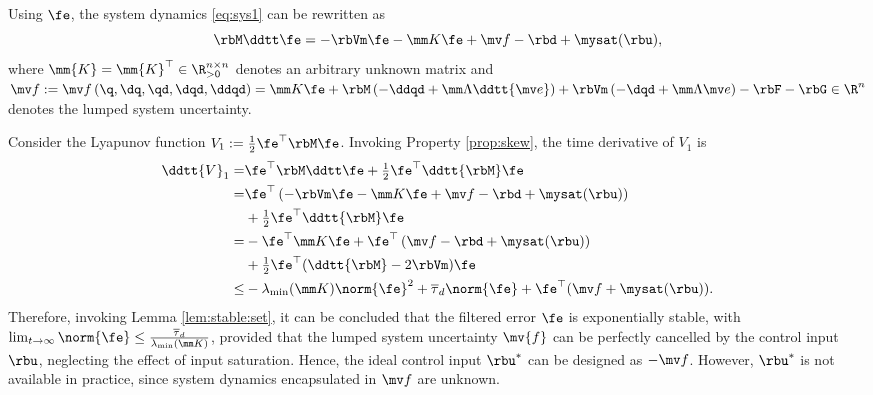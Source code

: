 \documentclass[journal]{IEEEtran}
\begin{document}
Using $\fe$, the system dynamics \eqref{eq:sys1} can be rewritten as
\begin{equation}
   \rbM \ddtt\fe
    =
    -\rbVm \fe
    -\mm K \fe
    + \mv f
    -\rbd + \mysat(\rbu)
    ,
    \label{eq:sys:filtered}
\end{equation}
where $\mm{K}=\mm{K}^\top\in\R^{n\times n}_{>0}$ denotes an arbitrary unknown matrix and $
    \mv f:= \mv f
    \left(
        \q,\dq,\qd,\dqd,\ddqd
    \right)
    =
    \mm K \fe
    +\rbM
    \left(
        -\ddqd+\mm\Lambda\ddtt{\mv e}
    \right)
    +
    \rbVm
    \left(
        -\dqd+\mm\Lambda\mv e
    \right)
    -
    \rbF
    -
    \rbG
    \in\R^n
$ denotes the lumped system uncertainty.

Consider the Lyapunov function $V_1:= \tfrac{1}{2}\fe^\top \rbM\fe$. 
Invoking Property \ref{prop:skew}, the time derivative of $V_1$ is
\begin{equation}
    \begin{aligned}
        \ddtt{V}_1
        =&
        \fe^\top \rbM \ddtt \fe
        +
        \tfrac{1}{2}\fe^\top \ddtt{\rbM}\fe
        \\
        =&
        \fe^\top 
        \left(
            -\rbVm \fe -\mm K \fe + \mv f
            -\rbd + \mysat(\rbu)
        \right)
        \\
        &
        +
        \tfrac{1}{2}
        \fe^\top \ddtt{\rbM}\fe
        \\
        =&
        -
        \fe^\top \mm K \fe 
        +
        \fe^\top 
        \left(
            \mv f
            -\rbd
            +\mysat(\rbu)
        \right)
        \\
        &
        +
        \tfrac{1}{2}
        \fe^\top(\ddtt{\rbM}- 2\rbVm)\fe
        \\
        \le&
        -\lambda_{\min}(\mm K)\norm{\fe}^2
        +
        \overline\tau_d\norm{\fe}
        +
        \fe^\top (\mv f+\mysat(\rbu))
        .
    \end{aligned}
    \label{eq:lya1:dot1}
\end{equation} 
Therefore, invoking Lemma \ref{lem:stable:set}, it can be concluded that the filtered error $\fe$ is exponentially stable, with $\lim_{t\to\infty}\norm{\fe}\le\tfrac{\overline\tau_d}{\lambda_{\min}(\mm K)}$, provided that the lumped system uncertainty $\mv{f}$ can be perfectly cancelled by the control input $\rbu$, neglecting the effect of input saturation.
Hence, the ideal control input $\rbu^*$ can be designed as $-\mv f$.
However, $\rbu^*$ is not available in practice, since system dynamics encapsulated in $\mv f$ are unknown.
\end{document}
